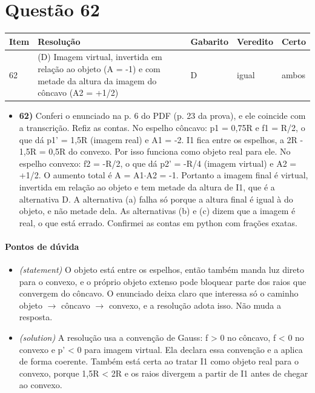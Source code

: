 \documentclass{article}%
\begin{document}
\section*{Questão 62}%
\begin{longtable}{@{}p{} p{} p{} p{} p{}@{}}\toprule Item & Resolução & Gabarito & Veredito & Certo \\ \midrule
62 & (D) Imagem virtual, invertida em relação ao objeto (A = -1) e com metade da altura da imagem do côncavo (A2 = +1/2) & D & igual & ambos \\
\bottomrule\end{longtable}%
\begin{itemize}%
\item%
\textbf{62)} Conferi o enunciado na p. 6 do PDF (p. 23 da prova), e ele coincide com a transcrição. Refiz as contas.\newline%
\newline%
No espelho côncavo: p1 = 0,75R e f1 = R/2, o que dá p1' = 1,5R (imagem real) e A1 = -2.\newline%
\newline%
I1 fica entre os espelhos, a 2R - 1,5R = 0,5R do convexo. Por isso funciona como objeto real para ele.\newline%
\newline%
No espelho convexo: f2 = -R/2, o que dá p2' = -R/4 (imagem virtual) e A2 = +1/2.\newline%
\newline%
O aumento total é A = A1$\cdot$A2 = -1. Portanto a imagem final é virtual, invertida em relação ao objeto e tem metade da altura de I1, que é a alternativa D.\newline%
\newline%
A alternativa (a) falha só porque a altura final é igual à do objeto, e não metade dela. As alternativas (b) e (c) dizem que a imagem é real, o que está errado.\newline%
\newline%
Confirmei as contas em python com frações exatas.%
\end{itemize}%
\paragraph{Pontos de dúvida}%
\begin{itemize}%
\item%
\textit{(statement)} O objeto está entre os espelhos, então também manda luz direto para o convexo, e o próprio objeto extenso pode bloquear parte dos raios que convergem do côncavo. O enunciado deixa claro que interessa só o caminho objeto $\to$ côncavo $\to$ convexo, e a resolução adota isso. Não muda a resposta.%
\item%
\textit{(solution)} A resolução usa a convenção de Gauss: f > 0 no côncavo, f < 0 no convexo e p' < 0 para imagem virtual. Ela declara essa convenção e a aplica de forma coerente. Também está certa ao tratar I1 como objeto real para o convexo, porque 1,5R < 2R e os raios divergem a partir de I1 antes de chegar ao convexo.%
\end{itemize}%
\end{document}
